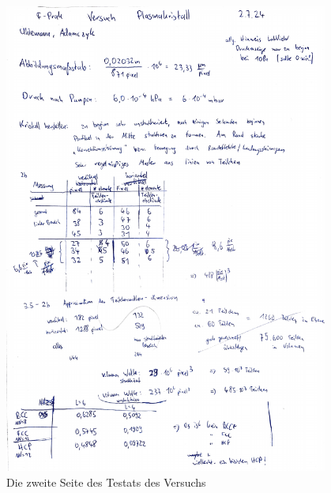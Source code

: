 \documentclass[12pt,a4paper,ngerman]{report}
\begin{document}
\begin{figure}[ht]
	\centering
	\includegraphics[width=0.95\textwidth, page=2]{data/Testat_Plasmakristall.pdf}		
	\caption[Testat 2]{Die zweite Seite des Testats des Versuchs}
	\label{fig:Testat}
\end{figure}
\end{document}
